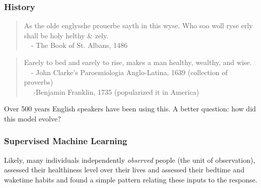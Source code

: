 \documentclass[slides]{beamer} %
\begin{document}
\begin{frame}\frametitle{History}

\begin{quotation}
As the olde englysshe prouerbe sayth in this wyse. Who soo woll ryse erly shall be holy helthy \& zely.\\
~~- The Book of St. Albans, 1486
\end{quotation}
	
\begin{quotation}
Earely to bed and earely to rise, makes a man healthy, wealthy, and wise. \\
~~- John Clarke's Paroemiologia Anglo-Latina, 1639 (collection of proverbs) \\
~~ -Benjamin Franklin, 1735 (popularized it in America)
\end{quotation}

Over 500 years English speakers have been using this. A better question: how did this model evolve?

\end{frame}

\begin{frame}\frametitle{Supervised Machine Learning}

Likely, many individuals independently \textit{observed} people (the unit of observation), assessed their healthiness level over their lives and assessed their bedtime and waketime habits and found a simple pattern relating these inputs to the response.
	
\end{frame}

\begin{frame}\frametitle{}

	
\end{frame}

\begin{frame}\frametitle{}

	
\end{frame}

\begin{frame}\frametitle{}

	
\end{frame}

\begin{frame}\frametitle{}

	
\end{frame}

\begin{frame}\frametitle{}

	
\end{frame}
\end{document}
